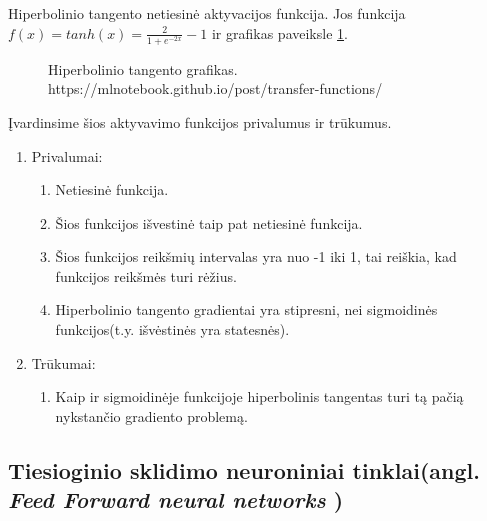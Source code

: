 Hiperbolinio tangento netiesinė aktyvacijos funkcija. Jos funkcija $f(x)=tanh(x)=\frac{2}{1+e^{-2x}}-1$ ir grafikas paveiksle \ref{fig:tanh}.

\begin{figure}[h!]
  \centering
{}
\caption{Hiperbolinio tangento grafikas.\\https://mlnotebook.github.io/post/transfer-functions/}
\label{fig:tanh}
\end{figure}

Įvardinsime šios aktyvavimo funkcijos privalumus ir trūkumus. \cite{Avinash2017}
\begin{enumerate}
  \item Privalumai:
    \begin{enumerate}
      \item Netiesinė funkcija.
      \item Šios funkcijos išvestinė taip pat netiesinė funkcija.
      \item Šios funkcijos reikšmių intervalas yra nuo -1 iki 1, tai reiškia, kad funkcijos reikšmės turi rėžius.
      \item Hiperbolinio tangento gradientai yra stipresni, nei sigmoidinės funkcijos(t.y. išvėstinės yra statesnės).
    \end{enumerate}
  \item Trūkumai:
    \begin{enumerate}
      \item Kaip ir sigmoidinėje funkcijoje hiperbolinis tangentas turi tą pačią nykstančio gradiento problemą.
    \end{enumerate}
\end{enumerate}


\subsection{Tiesioginio sklidimo neuroniniai tinklai(angl. \textit{Feed Forward neural networks })}

